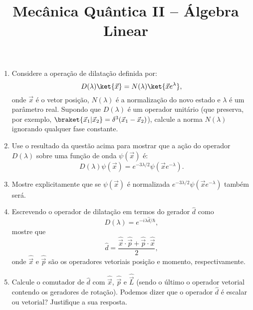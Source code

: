 \newif\ifuseseminar
\useseminartrue


\title{Mecânica Quântica II -- Álgebra Linear}


\begin{enumerate}
	\item Considere a operação de dilatação definida por:
	      \begin{equation}
		      D(\lambda)\ket{\vec{x}}=N(\lambda)\ket{\vec{x}e^\lambda},
	      \end{equation}
	      onde $\vec{x}$ é o vetor posição, $N(\lambda)$ é a normalização do novo estado
	      e $\lambda$ é um parâmetro real. Supondo que $D(\lambda)$ é um operador
	      unitário (que preserva, por exemplo, $\braket{\vec{x}_1|\vec{x}_2} =
		      \delta^3(\vec{x}_1-\vec{x}_2)$), calcule a norma $N(\lambda)$ ignorando
	      qualquer fase constante.
	\item Use o resultado da questão acima para mostrar que a ação do operador
	      $D(\lambda)$ sobre uma função de onda $\psi(\vec{x})$ é:
	      \begin{equation}
		      D(\lambda)\psi(\vec{x}) = e^{-3\lambda/2}\psi\left(\vec{x}e^{-\lambda}\right).
	      \end{equation}
	\item Mostre explicitamente que se $\psi(\vec{x})$ é normalizada
	      $e^{-3\lambda/2}\psi\left(\vec{x}e^{-\lambda}\right)$ também será.
	\item Escrevendo o operador de dilatação em termos do gerador $\hat{d}$ como
	      \begin{equation}
		      D(\lambda) = e^{-i\lambda\hat{d}/\hbar},
	      \end{equation}
	      mostre que
	      \begin{equation}
		      \hat{d} = \frac{\hat{\vec{x}}\cdot\hat{\vec{p}}+\hat{\vec{p}}\cdot\hat{\vec{x}}}{2},
	      \end{equation}
	      onde $\hat{\vec{x}}$ e $\hat{\vec{p}}$ são os operadores vetoriais posição e
	      momento, respectivamente.
	\item Calcule o comutador de $\hat{d}$ com $\hat{\vec{x}}$, $\hat{\vec{p}}$ e
	      $\hat{\vec{L}}$ (sendo o último o operador vetorial contendo os geradores de
	      rotação). Podemos dizer que o operador $\hat{d}$ é escalar ou vetorial? Justifique a
	      sua resposta.
\end{enumerate}


